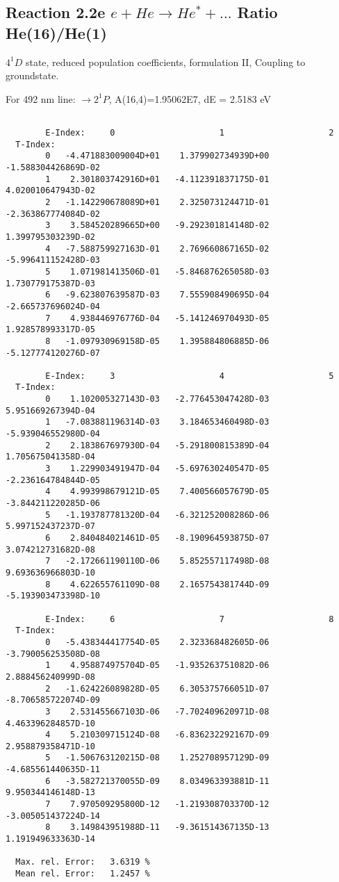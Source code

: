 \documentclass[12pt]{article}
\begin{document}
\subsection{
  Reaction 2.2e $e + He \rightarrow He^* + ... $ Ratio He(16)/He(1)
}

  $4^1D$ state,
  reduced population coefficients, formulation II,
  Coupling to groundstate.

  For 492 nm line: $\rightarrow 2^1P$, A(16,4)=1.95062E7, dE = 2.5183 eV

\begin{small}\begin{verbatim}

        E-Index:     0                     1                     2
  T-Index:
        0   -4.471883009004D+01    1.379902734939D+00   -1.588304426869D-02
        1    2.301803742916D+01   -4.112391837175D-01    4.020010647943D-02
        2   -1.142290678089D+01    2.325073124471D-01   -2.363867774084D-02
        3    3.584520289665D+00   -9.292301814148D-02    1.399795303239D-02
        4   -7.588759927163D-01    2.769660867165D-02   -5.996411152428D-03
        5    1.071981413506D-01   -5.846876265058D-03    1.730779175387D-03
        6   -9.623807639587D-03    7.555908490695D-04   -2.665737696024D-04
        7    4.938446976776D-04   -5.141246970493D-05    1.928578993317D-05
        8   -1.097930969158D-05    1.395884806885D-06   -5.127774120276D-07

        E-Index:     3                     4                     5
  T-Index:
        0    1.102005327143D-03   -2.776453047428D-03    5.951669267394D-04
        1   -7.083881196314D-03    3.184653460498D-03   -5.939046552980D-04
        2    2.183867697930D-04   -5.291800815389D-04    1.705675041358D-04
        3    1.229903491947D-04   -5.697630240547D-05   -2.236164784844D-05
        4    4.993998679121D-05    7.400566057679D-05   -3.844211220285D-06
        5   -1.193787781320D-04   -6.321252008286D-06    5.997152437237D-07
        6    2.840484021461D-05   -8.190964593875D-07    3.074212731682D-08
        7   -2.172661190110D-06    5.852557117498D-08    9.693636966803D-10
        8    4.622655761109D-08    2.165754381744D-09   -5.193903473398D-10

        E-Index:     6                     7                     8
  T-Index:
        0   -5.438344417754D-05    2.323368482605D-06   -3.790056253508D-08
        1    4.958874975704D-05   -1.935263751082D-06    2.888456240999D-08
        2   -1.624226089828D-05    6.305375766051D-07   -8.706585722074D-09
        3    2.531455667103D-06   -7.702409620971D-08    4.463396284857D-10
        4    5.210309715124D-08   -6.836232292167D-09    2.958879358471D-10
        5   -1.506763120215D-08    1.252708957129D-09   -4.685561440635D-11
        6   -3.582721370055D-09    8.034963393881D-11    9.950344146148D-13
        7    7.970509295800D-12   -1.219308703370D-12   -3.005051437224D-14
        8    3.149843951988D-11   -9.361514367135D-13    1.191949633363D-14

  Max. rel. Error:   3.6319 %
  Mean rel. Error:   1.2457 %



\end{verbatim}\end{small}
\end{document}
